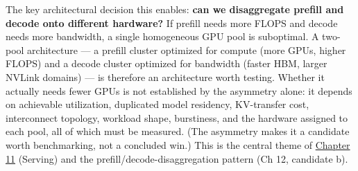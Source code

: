 The key architectural decision this enables: \textbf{can we disaggregate
prefill and decode onto different hardware?} If prefill needs more FLOPS
and decode needs more bandwidth, a single homogeneous GPU pool is
suboptimal. A two-pool architecture --- a prefill cluster optimized for
compute (more GPUs, higher FLOPS) and a decode cluster optimized for
bandwidth (faster HBM, larger NVLink domains) --- is therefore an
architecture worth testing. Whether it actually needs fewer GPUs is not
established by the asymmetry alone: it depends on achievable
utilization, duplicated model residency, KV-transfer cost, interconnect
topology, workload shape, burstiness, and the hardware assigned to each
pool, all of which must be measured. (The asymmetry makes it a candidate
worth benchmarking, not a concluded win.) This is the central theme of
\hyperref[chap:11]{Chapter 11} (Serving) and the prefill/decode-disaggregation pattern (Ch
12, candidate b).

\label{what-we-still-dont-know}


